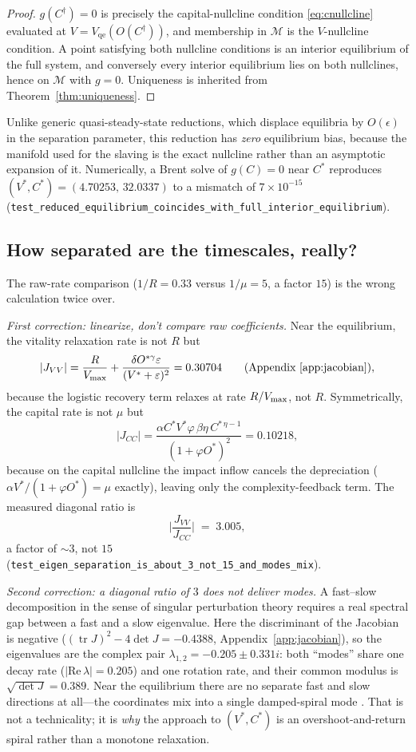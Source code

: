 \begin{proof}
$g(C^{\dagger})=0$ is precisely the capital-nullcline condition
\eqref{eq:cnullcline} evaluated at $V=V_{\mathrm{qe}}(O(C^{\dagger}))$, and
membership in $\mathcal{M}$ is the $V$-nullcline condition. A point
satisfying both nullcline conditions is an interior equilibrium of the
full system, and conversely every interior equilibrium lies on both
nullclines, hence on $\mathcal{M}$ with $g=0$. Uniqueness is inherited
from Theorem~\ref{thm:uniqueness}.
\end{proof}

Unlike generic quasi-steady-state reductions, which displace equilibria
by $O(\epsilon)$ in the separation parameter, this reduction has
\emph{zero} equilibrium bias, because the manifold used for the slaving
is the exact nullcline rather than an asymptotic expansion of it.
Numerically, a Brent solve of $g(C)=0$ near $C^{*}$ reproduces
$(V^{*},C^{*})=(4.70253,\,32.0337)$ to a mismatch of
$7\times10^{-15}$
(\texttt{test\_reduced\_equilibrium\_coincides\_with\_full\_interior\_equilibrium}).

\subsection{How separated are the timescales, really?}

The raw-rate comparison ($1/R=0.33$ versus $1/\mu=5$, a factor $15$) is
the wrong calculation twice over.

\emph{First correction: linearize, don't compare raw coefficients.} Near
the equilibrium, the vitality relaxation rate is not $R$ but
\[
|J_{VV}|
=\frac{R}{V_{\max}}
+\frac{\delta O^{*\gamma}\varepsilon}{(V^{*}+\varepsilon)^{2}}
=0.30704
\qquad(\text{Appendix~\ref{app:jacobian}}),
\]
because the logistic recovery term relaxes at rate $R/V_{\max}$, not $R$.
Symmetrically, the capital rate is not $\mu$ but
\[
|J_{CC}|
=\frac{\alpha C^{*}V^{*}\varphi\,\beta\eta\,C^{*\,\eta-1}}
       {(1+\varphi O^{*})^{2}}
=0.10218 ,
\]
because on the capital nullcline the impact inflow cancels the
depreciation ($\alpha V^{*}/(1+\varphi O^{*})=\mu$ exactly), leaving only
the complexity-feedback term. The measured diagonal ratio is
\[
\biggl|\frac{J_{VV}}{J_{CC}}\biggr| \;=\; 3.005 ,
\]
a factor of $\sim3$, not $15$
(\texttt{test\_eigen\_separation\_is\_about\_3\_not\_15\_and\_modes\_mix}).

\emph{Second correction: a diagonal ratio of $3$ does not deliver modes.}
A fast--slow decomposition in the sense of singular perturbation theory
requires a real spectral gap between a fast and a slow eigenvalue. Here
the discriminant of the Jacobian is negative
($(\operatorname{tr}J)^{2}-4\det J=-0.4388$, Appendix~\ref{app:jacobian}),
so the eigenvalues are the complex pair
$\lambda_{1,2}=-0.205\pm0.331i$: both ``modes'' share one decay rate
($|\mathrm{Re}\,\lambda|=0.205$) and one rotation rate, and their common
modulus is $\sqrt{\det J}=0.389$. Near the equilibrium there are no
separate fast and slow directions at all---the coordinates mix into a
single damped-spiral mode \citep{strogatz2015nonlinear}. That is not a
technicality; it is \emph{why} the approach to $(V^{*},C^{*})$ is an
overshoot-and-return spiral rather than a monotone relaxation.

